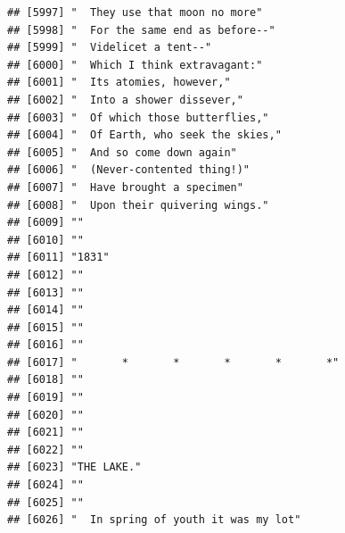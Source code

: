 \documentclass{article}\usepackage[]{graphicx}\usepackage[]{color}
\makeatletter
\newenvironment{kframe}{%
 \def\at@end@of@kframe{}%
 \ifinner\ifhmode%
  \def\at@end@of@kframe{\end{minipage}}%
  \begin{minipage}{\columnwidth}%
 \fi\fi%
 \def\FrameCommand##1{\hskip\@totalleftmargin \hskip-\fboxsep
 \colorbox{shadecolor}{##1}\hskip-\fboxsep
     \hskip-\linewidth \hskip-\@totalleftmargin \hskip\columnwidth}%
 \MakeFramed {\advance\hsize-\width
   \@totalleftmargin\z@ \linewidth\hsize
   \@setminipage}}%
 {\par\unskip\endMakeFramed%
 \at@end@of@kframe}
\newenvironment{knitrout}{}{} %
\makeatother
\begin{document}
\begin{knitrout}
\begin{kframe}
\begin{verbatim}
## [5997] "  They use that moon no more"                                                
## [5998] "  For the same end as before--"                                              
## [5999] "  Videlicet a tent--"                                                        
## [6000] "  Which I think extravagant:"                                                
## [6001] "  Its atomies, however,"                                                     
## [6002] "  Into a shower dissever,"                                                   
## [6003] "  Of which those butterflies,"                                               
## [6004] "  Of Earth, who seek the skies,"                                             
## [6005] "  And so come down again"                                                    
## [6006] "  (Never-contented thing!)"                                                  
## [6007] "  Have brought a specimen"                                                   
## [6008] "  Upon their quivering wings."                                               
## [6009] ""                                                                            
## [6010] ""                                                                            
## [6011] "1831"                                                                        
## [6012] ""                                                                            
## [6013] ""                                                                            
## [6014] ""                                                                            
## [6015] ""                                                                            
## [6016] ""                                                                            
## [6017] "       *       *       *       *       *"                                    
## [6018] ""                                                                            
## [6019] ""                                                                            
## [6020] ""                                                                            
## [6021] ""                                                                            
## [6022] ""                                                                            
## [6023] "THE LAKE."                                                                   
## [6024] ""                                                                            
## [6025] ""                                                                            
## [6026] "  In spring of youth it was my lot"                                          

\end{verbatim}
\end{kframe}
\end{knitrout}
\end{document}
